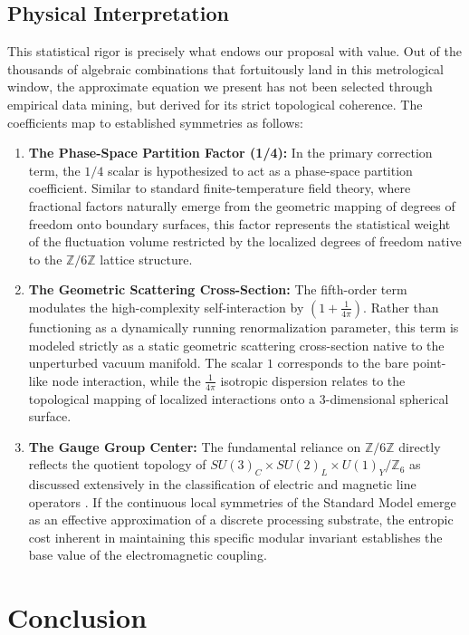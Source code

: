 \documentclass[12pt,a4paper]{article}
\begin{document}
\subsection{Physical Interpretation}

This statistical rigor is precisely what endows our proposal with value. Out of the thousands of algebraic combinations that fortuitously land in this metrological window, the approximate equation we present has not been selected through empirical data mining, but derived for its strict topological coherence. The coefficients map to established symmetries as follows:

\begin{enumerate}
    \item \textbf{The Phase-Space Partition Factor (1/4):} In the primary correction term, the $1/4$ scalar is hypothesized to act as a phase-space partition coefficient. Similar to standard finite-temperature field theory, where fractional factors naturally emerge from the geometric mapping of degrees of freedom onto boundary surfaces, this factor represents the statistical weight of the fluctuation volume restricted by the localized degrees of freedom native to the $\mathbb{Z}/6\mathbb{Z}$ lattice structure.
    \item \textbf{The Geometric Scattering Cross-Section:} The fifth-order term modulates the high-complexity self-interaction by $(1 + \frac{1}{4\pi})$. Rather than functioning as a dynamically running renormalization parameter, this term is modeled strictly as a static geometric scattering cross-section native to the unperturbed vacuum manifold. The scalar $1$ corresponds to the bare point-like node interaction, while the $\frac{1}{4\pi}$ isotropic dispersion relates to the topological mapping of localized interactions onto a 3-dimensional spherical surface.
    \item \textbf{The Gauge Group Center:} The fundamental reliance on $\mathbb{Z}/6\mathbb{Z}$ directly reflects the quotient topology of $SU(3)_C \times SU(2)_L \times U(1)_Y / \mathbb{Z}_6$ as discussed extensively in the classification of electric and magnetic line operators \cite{aharony2013}. If the continuous local symmetries of the Standard Model emerge as an effective approximation of a discrete processing substrate, the entropic cost inherent in maintaining this specific modular invariant establishes the base value of the electromagnetic coupling.
\end{enumerate}

\section{Conclusion}
\end{document}
